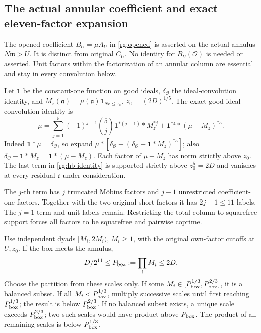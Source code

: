 \subsection{The actual annular coefficient and exact eleven-factor expansion}
\label{rg:hb-proof}
The opened coefficient \(B_U=\mu A_U\) in
\eqref{rg:opened} is asserted on the actual annulus \(N\mathfrak m>U\).
It is distinct from original \(C_U\).
No identity for \(B_U(\mathcal O)\) is needed or asserted.
Unit factors within the factorization of an annular column are
essential and stay in every convolution below.

Let \(\mathbf1\) be the constant-one function on good ideals,
\(\delta_{\mathcal O}\) the ideal-convolution identity, and
\(M_z(\mathfrak a)=\mu(\mathfrak a)
 \mathbf1_{N\mathfrak a\le z_0}\), \(z_0=(2D)^{1/5}\).
The exact good-ideal convolution identity is
\begin{equation}\label{rg:hb-identity}
 \mu=\sum_{j=1}^5(-1)^{j-1}\binom5j
                   \mathbf1^{*(j-1)}*M_z^{*j}
       +\mathbf1^{*4}*(\mu-M_z)^{*5}.
\end{equation}
Indeed \(\mathbf1*\mu=\delta_{\mathcal O}\), so expand
\(\mu*[\delta_{\mathcal O}
       -(\delta_{\mathcal O}-\mathbf1*M_z)^{*5}]\);
also \(\delta_{\mathcal O}-\mathbf1*M_z
       =\mathbf1*(\mu-M_z)\).
Each factor of \(\mu-M_z\) has norm strictly above \(z_0\).
The last term in \eqref{rg:hb-identity} is supported strictly above
\(z_0^5=2D\) and vanishes at every residual
\(\mathfrak c\) under consideration.

The \(j\)-th term has \(j\) truncated M\"obius factors and \(j-1\)
unrestricted coefficient-one factors. Together with the two original
short factors it has \(2j+1\le11\) labels.
The \(j=1\) term and unit labels remain. Restricting the total column
to squarefree support forces all factors to be squarefree and
pairwise coprime.

Use independent dyads \([M_i,2M_i)\), \(M_i\ge1\), with the original
own-factor cutoffs at \(U,z_0\). If the box meets the annulus,
\begin{equation}\label{rg:box-product}
 D/2^{11}\le P_{\rm box}:=\prod_iM_i\le2D .
\end{equation}
Choose the partition from these scales only.
If some \(M_i\in[P_{\rm box}^{1/3},P_{\rm box}^{2/3}]\), it is
a balanced subset. If all \(M_i<P_{\rm box}^{1/3}\), multiply
successive scales until first reaching \(P_{\rm box}^{1/3}\);
the result is below \(P_{\rm box}^{2/3}\).
If no balanced subset exists, a unique scale exceeds
\(P_{\rm box}^{2/3}\); two such scales would have product above
\(P_{\rm box}\). The product of all remaining scales is below
\(P_{\rm box}^{1/3}\).

